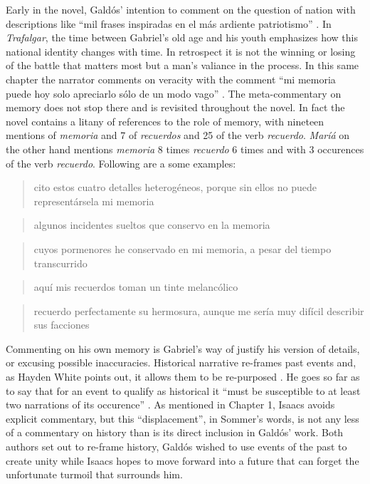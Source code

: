 \documentclass[12pt]{report}
\begin{document}
Early in the novel, Galdós' intention to comment on the question of nation with descriptions like \enquote{mil frases inspiradas en el más ardiente patriotismo} \cite[8]{Galdos1882}.
In \textit{Trafalgar}, the time between Gabriel's old age and his youth emphasizes how this national identity changes with time.
In retrospect it is not the winning or losing of the battle that matters most but a man's valiance in the process.
In this same chapter the narrator comments on veracity with the comment \enquote{mi memoria puede hoy solo apreciarlo sólo de un modo vago} \cite[9]{Galdos1882}.
The meta-commentary on memory does not stop there and is revisited throughout the novel.
In fact the novel contains a litany of references to the role of memory, with nineteen mentions of \textit{memoria} and 7 of \textit{recuerdos} and 25 of the verb \textit{recuerdo}.
\textit{Maríá} on the other hand mentions \textit{memoria} 8 times \textit{recuerdo} 6 times and with 3 occurences of the verb \textit{recuerdo}.
Following are a some examples: 
\blockquote{cito estos cuatro detalles heterogéneos, porque sin ellos no puede representársela mi memoria} \cite[13]{Galdos1882}
\blockquote{algunos incidentes sueltos que conservo en la memoria} \cite[66]{Galdos1882}
\blockquote{cuyos pormenores he conservado en mi memoria, a pesar del tiempo transcurrido}  \cite[392]{Galdos1882}
\blockquote{aquí mis recuerdos toman un tinte melancólico} \cite[426]{Galdos1882}
\blockquote{recuerdo perfectamente su hermosura, aunque me sería muy difícil describir sus facciones}.
Commenting on his own memory is Gabriel's way of justify his version of details, or excusing possible inaccuracies.
Historical narrative re-frames past events and, as Hayden White points out, it allows them to be re-purposed \cite[18]{White1980}.
He goes so far as to say that for an event to qualify as historical it \enquote{must be susceptible to at least two narrations of its occurence} \cite[23]{White1980}.
As mentioned in Chapter 1, Isaacs avoids explicit commentary, but this \enquote{displacement}, in Sommer's words, is not any less of a commentary on history than is its direct inclusion in Galdós' work.
Both authors set out to re-frame history, Galdós wished to use events of the past to create unity while Isaacs hopes to move forward into a future that can forget the unfortunate turmoil that surrounds him.
\end{document}
